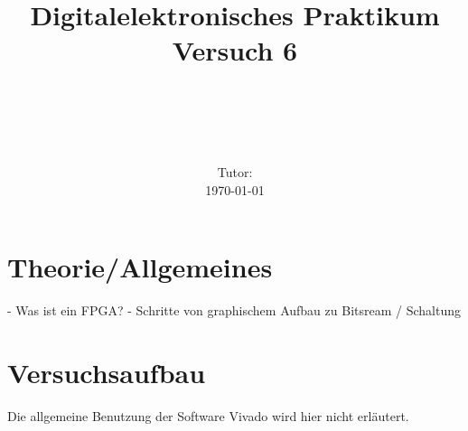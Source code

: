 \documentclass[11pt, a4paper]{article}
\title{\textbf{Digitalelektronisches Praktikum\\ Versuch 6}}
\author{\ATutantName \\ \emph{\ATutantEmail} \and \BTutantName\\ \emph{\BTutantEmail}}
\date{\Gruppennummer \\[3ex] Tutor: \Tutorname \\[3ex] \today}
\begin{document}
\clearpage
\maketitle
\thispagestyle{empty}
\newpage

\section*{Theorie/Allgemeines}
- Was ist ein FPGA?
- Schritte von graphischem Aufbau zu Bitsream / Schaltung
\section*{Versuchsaufbau}
Die allgemeine Benutzung der Software Vivado wird hier nicht erläutert.
\end{document}
